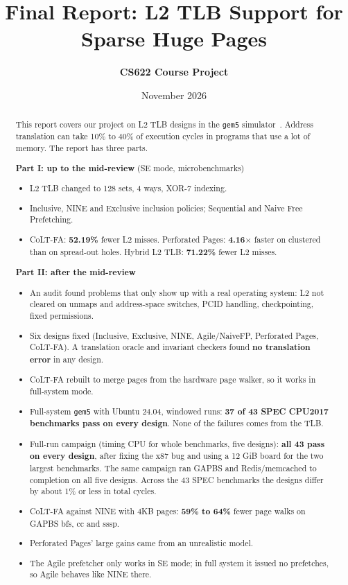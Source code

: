 \documentclass[11pt,a4paper]{article}
\title{\textbf{Final Report: L2 TLB Support for Sparse Huge Pages}}
\author{\textbf{CS622 Course Project}}
\date{November 2026}
\begin{document}
\maketitle

\begin{abstract}
This report covers our project on L2 TLB designs in the \texttt{gem5} simulator~\cite{binkert2011gem5}. Address translation can take 10\% to 40\% of execution cycles in programs that use a lot of memory. The report has three parts.

\textbf{Part I: up to the mid-review} (SE mode, microbenchmarks)
\begin{itemize}
    \item L2 TLB changed to 128 sets, 4 ways, XOR-7 indexing.
    \item Inclusive, NINE and Exclusive inclusion policies; Sequential and Naive Free Prefetching.
    \item CoLT-FA: \textbf{52.19\%} fewer L2 misses. Perforated Pages: \textbf{4.16$\times$} faster on clustered than on spread-out holes. Hybrid L2 TLB: \textbf{71.22\%} fewer L2 misses.
\end{itemize}

\textbf{Part II: after the mid-review}
\begin{itemize}
    \item An audit found problems that only show up with a real operating system: L2 not cleared on unmaps and address-space switches, PCID handling, checkpointing, fixed permissions.
    \item Six designs fixed (Inclusive, Exclusive, NINE, Agile/NaiveFP, Perforated Pages, CoLT-FA). A translation oracle and invariant checkers found \textbf{no translation error} in any design.
    \item CoLT-FA rebuilt to merge pages from the hardware page walker, so it works in full-system mode.
    \item Full-system \texttt{gem5} with Ubuntu 24.04, windowed runs: \textbf{37 of 43 SPEC CPU2017 benchmarks pass on every design}. None of the failures comes from the TLB.
    \item Full-run campaign (timing CPU for whole benchmarks, five designs): \textbf{all 43 pass on every design}, after fixing the x87 bug and using a 12 GiB board for the two largest benchmarks. The same campaign ran GAPBS and Redis/memcached to completion on all five designs. Across the 43 SPEC benchmarks the designs differ by about 1\% or less in total cycles.
    \item CoLT-FA against NINE with 4KB pages: \textbf{59\% to 64\%} fewer page walks on GAPBS bfs, cc and sssp.
    \item Perforated Pages' large gains came from an unrealistic model.
    \item The Agile prefetcher only works in SE mode; in full system it issued no prefetches, so Agile behaves like NINE there.
\end{itemize}


\end{abstract}
\end{document}
